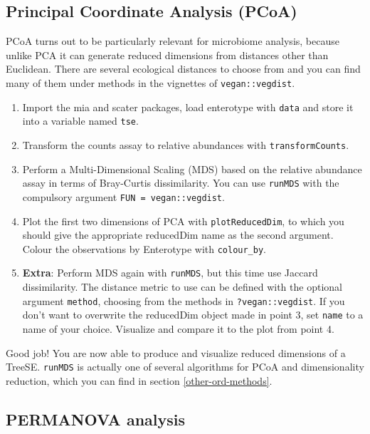 \documentclass[
]{book}
\providecommand{\tightlist}{%
  \setlength{\itemsep}{0pt}\setlength{\parskip}{0pt}}
\begin{document}
\hypertarget{principal-coordinate-analysis-pcoa}{%
\subsection{Principal Coordinate Analysis (PCoA)}\label{principal-coordinate-analysis-pcoa}}

PCoA turns out to be particularly relevant for microbiome analysis, because
unlike PCA it can generate reduced dimensions from distances other than
Euclidean. There are several ecological distances to choose from and you can
find many of them under methods in the vignettes of \texttt{vegan::vegdist}.

\begin{enumerate}
\def\labelenumi{\arabic{enumi}.}
\tightlist
\item
  Import the mia and scater packages, load enterotype with \texttt{data} and store it
  into a variable named \texttt{tse}.
\item
  Transform the counts assay to relative abundances with \texttt{transformCounts}.
\item
  Perform a Multi-Dimensional Scaling (MDS) based on the relative abundance
  assay in terms of Bray-Curtis dissimilarity. You can use \texttt{runMDS} with the
  compulsory argument \texttt{FUN\ =\ vegan::vegdist}.
\item
  Plot the first two dimensions of PCA with \texttt{plotReducedDim}, to which you
  should give the appropriate reducedDim name as the second argument. Colour
  the observations by Enterotype with \texttt{colour\_by}.
\item
  \textbf{Extra}: Perform MDS again with \texttt{runMDS}, but this time use Jaccard
  dissimilarity. The distance metric to use can be defined with the optional
  argument \texttt{method}, choosing from the methods in \texttt{?vegan::vegdist}. If you
  don't want to overwrite the reducedDim object made in point 3, set \texttt{name} to
  a name of your choice. Visualize and compare it to the plot from point 4.
\end{enumerate}

Good job! You are now able to produce and visualize reduced dimensions of a
TreeSE. \texttt{runMDS} is actually one of several algorithms for PCoA and dimensionality
reduction, which you can find in section \ref{other-ord-methods}.

\hypertarget{permanova-analysis}{%
\subsection{PERMANOVA analysis}\label{permanova-analysis}}
\end{document}
